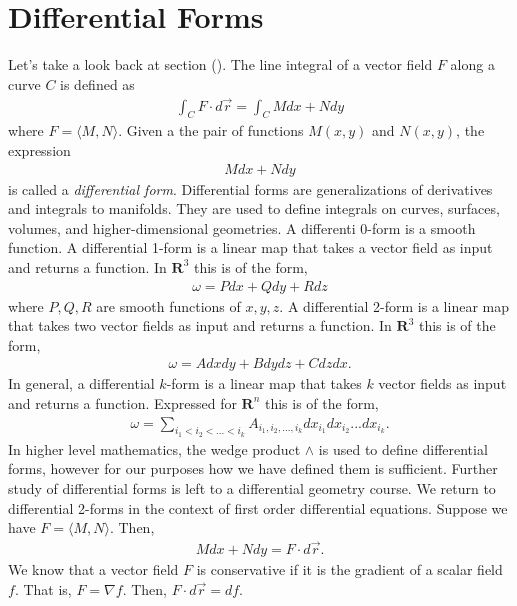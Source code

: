 \section{Differential Forms}
\noindent Let's take a look back at section (). 
The line integral of a vector field $F$ along a curve $C$ is defined as
\begin{align*}
\int_C F \cdot d\vec{r} = \int_C Mdx + Ndy
\end{align*}
where $F = \langle M, N \rangle$.
Given a the pair of functions $M(x,y)$ and $N(x,y)$, the expression
\begin{align*}
Mdx + Ndy
\end{align*}
is called a \textit{differential form}. 
Differential forms are generalizations of derivatives and integrals to manifolds. 
They are used to define integrals on curves, surfaces, volumes, and higher-dimensional geometries. 
A differenti 0-form is a smooth function.
A differential 1-form is a linear map that takes a vector field as input and returns a function. 
In $\mathbf{R}^3$ this is of the form,
\begin{align*}
\omega = Pdx + Qdy + Rdz
\end{align*}
where $P, Q, R$ are smooth functions of $x, y, z$.
A differential 2-form is a linear map that takes two vector fields as input and returns a function.
In $\mathbf{R}^3$ this is of the form,
\begin{align*}
\omega = Adxdy + Bdydz + Cdzdx.
\end{align*}
In general, a differential $k$-form is a linear map that takes $k$ vector fields as input and returns a function.
Expressed for $\mathbf{R}^n$ this is of the form,
\begin{align*}
\omega = \sum_{i_1 < i_2 < ... < i_k} A_{i_1, i_2, ..., i_k} dx_{i_1}dx_{i_2}...dx_{i_k}.
\end{align*}
In higher level mathematics, the wedge product $\wedge$ is used to define differential forms, however for our purposes how we have defined them is sufficient.
Further study of differential forms is left to a differential geometry course. 
\newline
We return to differential 2-forms in the context of first order differential equations.
Suppose we have $F = \langle M, N \rangle$. 
Then,
\begin{align*}
    Mdx + Ndy = F \cdot d\vec{r}.
\end{align*}
We know that a vector field $F$ is conservative if it is the gradient of a scalar field $f$.
That is, $F = \nabla f$.
Then, $F \cdot d\vec{r} = df$.
